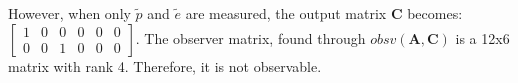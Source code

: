 However, when only $\tilde{p}$ and $\tilde{e}$ are measured, the output matrix $\bm{C}$ becomes:
	$\begin{bmatrix}
    1 & 0 & 0 & 0 & 0 & 0 \\
    0 & 0 & 1 & 0 & 0 & 0
	\end{bmatrix}$.
The observer matrix, found through $obsv(\bm{A},\bm{C})$ is a 12x6 matrix with rank 4. Therefore, it is not observable.
